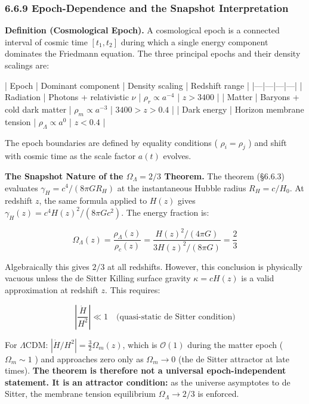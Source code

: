 \documentclass[11pt,a4paper]{article}
\theoremstyle{definition}
\theoremstyle{remark}
\begin{document}
\subsubsection{6.6.9 Epoch-Dependence and the Snapshot Interpretation}

\textbf{Definition (Cosmological Epoch).} A cosmological epoch is a connected interval of cosmic time $[t_1, t_2]$ during which a single energy component dominates the Friedmann equation. The three principal epochs and their density scalings are:

| Epoch | Dominant component | Density scaling | Redshift range |
|---|---|---|---|
| Radiation | Photons + relativistic $\nu$ | $\rho_r \propto a^{-4}$ | $z > 3400$ |
| Matter | Baryons + cold dark matter | $\rho_m \propto a^{-3}$ | $3400 > z > 0.4$ |
| Dark energy | Horizon membrane tension | $\rho_\Lambda \propto a^{0}$ | $z < 0.4$ |

The epoch boundaries are defined by equality conditions ( $\rho_i = \rho_j$ ) and shift with cosmic time as the scale factor $a(t)$ evolves.

\textbf{The Snapshot Nature of the $\Omega_\Lambda = 2/3$ Theorem.} The theorem (\S 6.6.3) evaluates $\gamma_H = c^4/(8\pi G R_H)$ at the instantaneous Hubble radius $R_H = c/H_0$. At redshift $z$, the same formula applied to $H(z)$ gives $\gamma_H(z) = c^4 H(z)^2 / (8\pi G c^2)$. The energy fraction is:


\begin{equation}
\Omega_\Lambda(z) = \frac{\rho_\Lambda(z)}{\rho_c(z)} = \frac{H(z)^2/(4\pi G)}{3H(z)^2/(8\pi G)} = \frac{2}{3}
\end{equation}


Algebraically this gives $2/3$ at all redshifts. However, this conclusion is physically vacuous unless the de Sitter Killing surface gravity $\kappa = cH(z)$ is a valid approximation at redshift $z$. This requires:


\begin{equation}
\left|\frac{\dot{H}}{H^2}\right| \ll 1 \quad \text{(quasi-static de Sitter condition)}
\end{equation}


For $\Lambda$CDM: $|\dot{H}/H^2| = \frac{3}{2}\Omega_m(z)$, which is $\mathcal{O}(1)$ during the matter epoch ( $\Omega_m \sim 1$ ) and approaches zero only as $\Omega_m \to 0$ (the de Sitter attractor at late times). \textbf{The theorem is therefore not a universal epoch-independent statement. It is an attractor condition:} as the universe asymptotes to de Sitter, the membrane tension equilibrium $\Omega_\Lambda \to 2/3$ is enforced.
\end{document}
